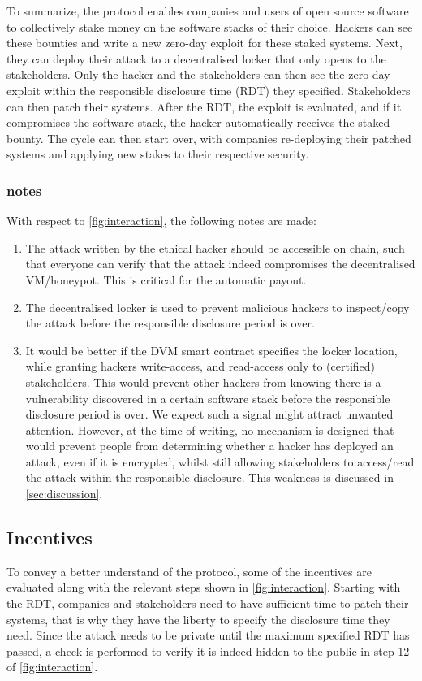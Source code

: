 To summarize, the protocol enables companies and users of open source software to collectively stake money on the software stacks of their choice. Hackers can see these bounties and write a new zero-day exploit for these staked systems. Next, they can deploy their attack to a decentralised locker that only opens to the stakeholders. Only the hacker and the stakeholders can then see the zero-day exploit within the responsible disclosure time (RDT) they specified. Stakeholders can then patch their systems. After the RDT, the exploit is evaluated, and if it compromises the software stack, the hacker automatically receives the staked bounty. The cycle can then start over, with companies re-deploying their patched systems and applying new stakes to their respective security.


\subsubsection{ notes}
With respect to \cref{fig:interaction}, the following notes are made:
\begin{enumerate} 
    \item The attack written by the ethical hacker should be accessible on chain, such that everyone can verify that the attack indeed compromises the decentralised VM/honeypot. This is critical for the automatic payout.
    \item The decentralised locker is used to prevent malicious hackers to inspect/copy the attack before the responsible disclosure period is over.
    \item It would be better if the DVM smart contract specifies the locker location, while granting hackers write-access, and read-access only to (certified) stakeholders. This would prevent other hackers from knowing there is a vulnerability discovered in a certain software stack before the responsible disclosure period is over. We expect such a signal might attract unwanted attention. However, at the time of writing, no mechanism is designed that would prevent people from determining whether a hacker has deployed an attack, even if it is encrypted, whilst still allowing stakeholders to access/read the attack within the responsible disclosure. This weakness is discussed in \cref{sec:discussion}.
\end{enumerate}

\subsection{Incentives}
To convey a better understand of the protocol, some of the incentives are evaluated along with the relevant steps shown in \cref{fig:interaction}. Starting with the RDT, companies and stakeholders need to have sufficient time to patch their systems, that is why they have the liberty to specify the disclosure time they need. Since the attack needs to be private until the maximum specified RDT has passed, a check is performed to verify it is indeed hidden to the public in step 12 of \cref{fig:interaction}. 

